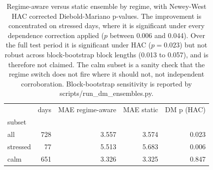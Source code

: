 \begin{table}[htbp]
\caption{Regime-aware versus static ensemble by regime, with Newey-West HAC corrected Diebold-Mariano p-values. The improvement is concentrated on stressed days, where it is significant under every dependence correction applied ($p$ between 0.006 and 0.044). Over the full test period it is significant under HAC ($p=0.023$) but not robust across block-bootstrap block lengths (0.013 to 0.057), and is therefore not claimed. The calm subset is a sanity check that the regime switch does not fire where it should not, not independent corroboration. Block-bootstrap sensitivity is reported by scripts/run\_dm\_ensembles.py.}
\label{tab:dm-regime-split}
\begin{tabular}{lrrrr}
\toprule
 & days & MAE regime-aware & MAE static & DM p (HAC) \\
subset &  &  &  &  \\
\midrule
all & 728 & 3.557 & 3.574 & 0.023 \\
stressed & 77 & 5.513 & 5.683 & 0.006 \\
calm & 651 & 3.326 & 3.325 & 0.847 \\
\bottomrule
\end{tabular}
\end{table}
